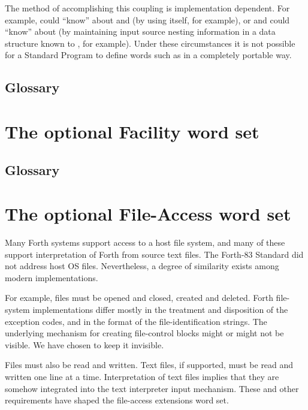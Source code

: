 The method of accomplishing this coupling is implementation dependent.
For example,  could ``know'' about  and
 (by using  itself, for example), or
 and  could ``know'' about 
(by maintaining input source nesting information in a data structure
known to , for example). Under these circumstances it is
not possible for a Standard Program to define words such as
 in a completely portable way.

\setcounter{subsection}{5}
\subsection{Glossary} %



\section{The optional Facility word set} %
\label{rat:facility}

\setcounter{subsection}{5}
\subsection{Glossary} %



\section{The optional File-Access word set} %
\label{rat:file}

Many Forth systems support access to a host file system, and many of
these support interpretation of Forth from source text files.  The
Forth-83 Standard did not address host OS files.  Nevertheless, a
degree of similarity exists among modern implementations.

For example, files must be opened and closed, created and deleted.
Forth file-system implementations differ mostly in the treatment and
disposition of the exception codes, and in the format of the
file-identification strings.  The underlying mechanism for creating
file-control blocks might or might not be visible.  We have chosen to
keep it invisible.

Files must also be read and written. Text files, if supported, must
be read and written one line at a time. Interpretation of text files
implies that they are somehow integrated into the text interpreter
input mechanism.  These and other requirements have shaped the
file-access extensions word set.

